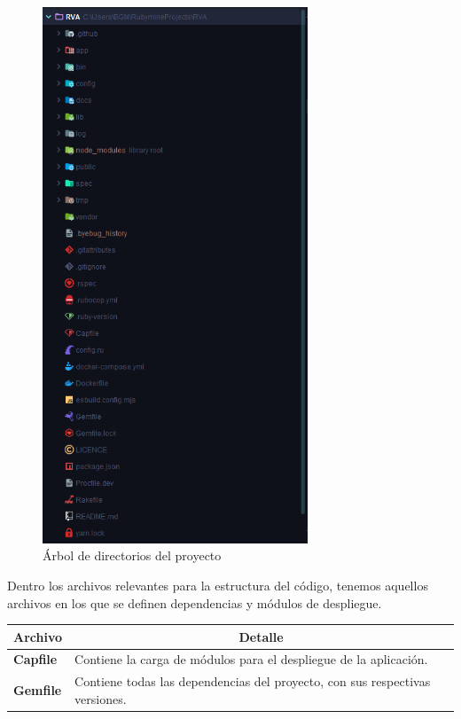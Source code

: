 \begin{figure}[H]
  \begin{center}
    \includegraphics[height=16cm]{img/tree.png} 
  \end{center}
  \caption[Árbol de directorios del proyecto]{Árbol de directorios del proyecto}
  \label{fig:tree.png}
\end{figure}

Dentro los archivos relevantes para la estructura del código, tenemos aquellos archivos en los que se definen dependencias y módulos de despliegue.

\begin{center}
  \begin{tabular}{ | l | p{12.5cm} |}
    \hline
    \multicolumn{1}{|c|}{\textbf{Archivo}} & \multicolumn{1}{|c|}{\textbf{Detalle}} \\
    \hline
    
    {\textbf{Capfile}} & Contiene la carga de módulos para el despliegue de la aplicación. \\ \hline
    {\textbf{Gemfile}} & Contiene todas las dependencias del proyecto, con sus respectivas versiones. \\ \hline
  \end{tabular}
  
  \label{table:dependencies}
\end{center}

